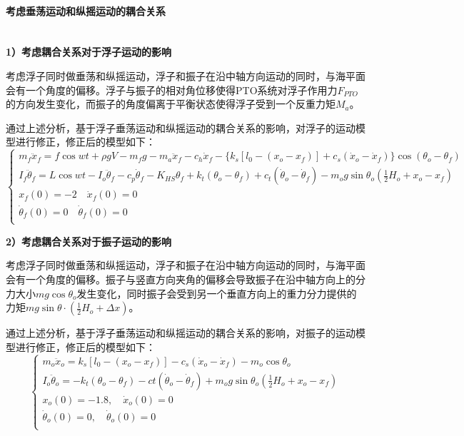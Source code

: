 \documentclass{my_paper}
\newcommand{\subsubsubsection}[1]{\paragraph{#1}\mbox{}\\}
\begin{document}
\subsubsubsection{考虑垂荡运动和纵摇运动的耦合关系}

    \textbf{1）考虑耦合关系对于浮子运动的影响}
    
        考虑浮子同时做垂荡和纵摇运动，浮子和振子在沿中轴方向运动的同时，与海平面会有一个角度的偏移。浮子与振子的相对角位移使得PTO系统对浮子作用力$F_{PTO}$的方向发生变化，而振子的角度偏离于平衡状态使得浮子受到一个反重力矩$M_{a}$。
        
        通过上述分析，基于浮子垂荡运动和纵摇运动的耦合关系的影响，对浮子的运动模型进行修正，修正后的模型如下：
        \begin{equation}
            \left\{\begin{matrix}
                 m_f\ddot x_f=f \cos wt+\rho g V-m_f g-m_{a}\ddot x_f-c_h \dot x_{f}-\{k_s[l_{0}-(x_{o}-x_{f})]+c_{s}(\dot x_{o}-\dot x_{f})\}\cos(\theta_{o}-\theta_{f}) \\
                    I_f\ddot\theta_{f}=L\cos wt -I_o\ddot\theta_{f}-c_p\dot\theta_{f}-K_{HS}\theta_{f}+k_t(\theta_{o}-
    \theta_{f})+c_t(\dot\theta_{o}-\dot\theta_{f})-m_og\sin \theta_{o}(\frac{1}{2}H_o+x_o-x_f) \\
        x_{f} (0)=-2 \quad \dot x_{f}(0)=0\\
    \dot\theta_{f} (0)=0 \quad \dot\theta_{f}(0)=0\\
            \end{matrix}\right.
        \end{equation}
        
        
    \textbf{2）考虑耦合关系对于振子运动的影响}
        
        考虑浮子同时做垂荡和纵摇运动，浮子和振子在沿中轴方向运动的同时，与海平面会有一个角度的偏移。振子与竖直方向夹角的偏移会导致振子在沿中轴方向上的分力大小$mg\cos \theta_{o}$发生变化，同时振子会受到另一个垂直方向上的重力分力提供的力矩$mg\sin \theta \cdot (\frac{1}{2}H_{o}+\Delta x)$。
        
        通过上述分析，基于浮子垂荡运动和纵摇运动的耦合关系的影响，对振子的运动模型进行修正，修正后的模型如下：
        \begin{equation}
        \left\{\begin{matrix}
        m_{o}\ddot x_{o}=k_{s}[l_{0}-(x_{o}-x_{f})]-c_{s}(\dot x_{o}-\dot x_{f})-m_{o}\cos \theta_{o} \\  
        I_o\ddot\theta_{o}=-k_t(\theta_o-\theta_f)-ct(\dot\theta_o-\dot\theta_f)+m_og\sin \theta_{o}(\frac{1}{2}H_o+x_o-x_f)\\
        x_o(0)=-1.8, \quad \dot x_{o}(0)=0\\
        \dot \theta_o(0)=0, \quad \dot \theta_o(0)=0\\
        
        \end{matrix}\right.
        \end{equation}
        
\end{document}
